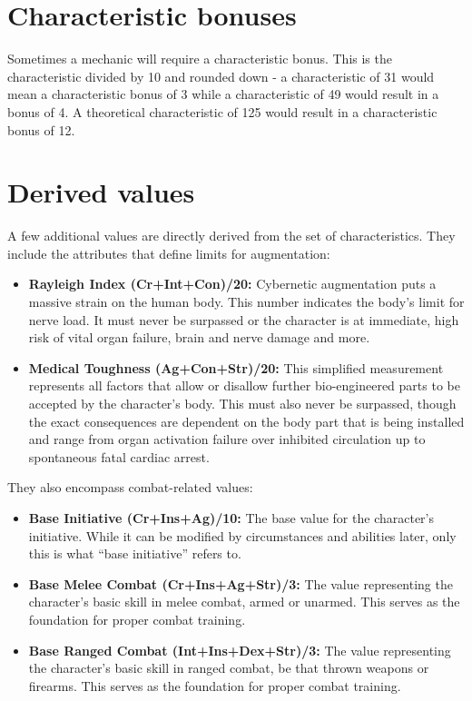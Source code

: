 \documentclass[12pt,a4paper,openany]{book}
\begin{document}
	\section{Characteristic bonuses}
	Sometimes a mechanic will require a characteristic bonus. This is the characteristic divided by 10 and rounded down - a characteristic of 31 would mean a characteristic bonus of 3 while a characteristic of 49 would result in a bonus of 4. A theoretical characteristic of 125 would result in a characteristic bonus of 12.
	\section{Derived values}
	A few additional values are directly derived from the set of characteristics. They include the attributes that define limits for augmentation:
	\begin{itemize}
		\setlength\itemsep{-8mm}
		\item \textbf{Rayleigh Index \textlangle(Cr+Int+Con)/20\textrangle:} Cybernetic augmentation puts a massive strain on the human body. This number indicates the body’s limit for nerve load. It must never be surpassed or the character is at immediate, high risk of vital organ failure, brain and nerve damage and more.
		\item \textbf{Medical Toughness \textlangle(Ag+Con+Str)/20\textrangle:} This simplified measurement represents all factors that allow or disallow further bio-engineered parts to be accepted by the character’s body. This must also never be surpassed, though the exact consequences are dependent on the body part that is being installed and range from organ activation failure over inhibited circulation up to spontaneous fatal cardiac arrest.
	\end{itemize}

	They also encompass combat-related values:
	\begin{itemize}
		\setlength\itemsep{-8mm}
		\item \textbf{Base Initiative \textlangle(Cr+Ins+Ag)/10\textrangle:} The base value for the character’s initiative. While it can be modified by circumstances and abilities later, only this is what “base initiative” refers to.
		\item \textbf{Base Melee Combat \textlangle(Cr+Ins+Ag+Str)/3\textrangle:} The value representing the character’s basic skill in melee combat, armed or unarmed. This serves as the foundation for proper combat training.
		\item \textbf{Base Ranged Combat \textlangle(Int+Ins+Dex+Str)/3\textrangle:} The value representing the character’s basic skill in ranged combat, be that thrown weapons or firearms. This serves as the foundation for proper combat training.
	\end{itemize}
\end{document}
